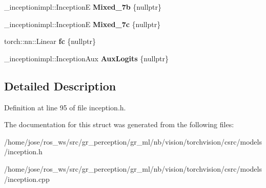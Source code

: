 \begin{DoxyCompactItemize}
\+\_\+inceptionimpl\+::\+InceptionE {\bfseries Mixed\+\_\+7b} \{nullptr\}
\item 
\mbox{\label{structvision_1_1models_1_1InceptionV3Impl_a10a3ed7f5a422815178cde34279ab301}} 
\+\_\+inceptionimpl\+::\+InceptionE {\bfseries Mixed\+\_\+7c} \{nullptr\}
\item 
\mbox{\label{structvision_1_1models_1_1InceptionV3Impl_a5dd8375c63a83761b67e4de6c7f1fcf5}} 
torch\+::nn\+::\+Linear {\bfseries fc} \{nullptr\}
\item 
\mbox{\label{structvision_1_1models_1_1InceptionV3Impl_aaafdc4c7d30d69d743a5d4cf882f9a5b}} 
\+\_\+inceptionimpl\+::\+Inception\+Aux {\bfseries Aux\+Logits} \{nullptr\}
\end{DoxyCompactItemize}


\subsection{Detailed Description}


Definition at line 95 of file inception.\+h.



The documentation for this struct was generated from the following files\+:\begin{DoxyCompactItemize}
\item 
/home/jose/ros\+\_\+ws/src/gr\+\_\+perception/gr\+\_\+ml/nb/vision/torchvision/csrc/models/inception.\+h\item 
/home/jose/ros\+\_\+ws/src/gr\+\_\+perception/gr\+\_\+ml/nb/vision/torchvision/csrc/models/inception.\+cpp\end{DoxyCompactItemize}
